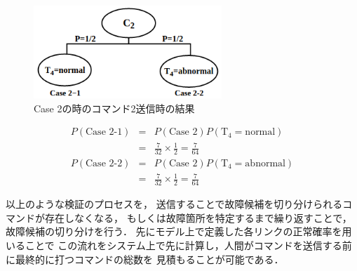 \documentclass[11pt]{jsreport}
\begin{document}
\begin{figure}[H]
   \centering
      \includegraphics[height=3.5cm]{figure/TEL_result_process2.png}
      \caption{Case 2の時のコマンド2送信時の結果}
      \label{fig:TEL_result2}
\end{figure}
\vspace{-1zh}
\begin{eqnarray}
   P(\text{Case 2-1})  &=& P(\text{Case 2}) P(\text{T}_4=\text{normal}) \nonumber \\
     &=& \frac{7}{32} \times \frac{1}{2} = \frac{7}{64} \label{eq:T4=normal} \\
   P(\text{Case 2-2})  &=& P(\text{Case 2}) P(\text{T}_4=\text{abnormal}) \nonumber \\
     &=& \frac{7}{32} \times \frac{1}{2} = \frac{7}{64} \label{eq:T4=abnormal}
\end{eqnarray}

以上のような検証のプロセスを，
送信することで故障候補を切り分けられるコマンドが存在しなくなる，
もしくは故障箇所を特定するまで繰り返すことで，故障候補の切り分けを行う．
先にモデル上で定義した各リンクの正常確率を用いることで
この流れをシステム上で先に計算し，人間がコマンドを送信する前に最終的に打つコマンドの総数を
見積もることが可能である．
\end{document}
